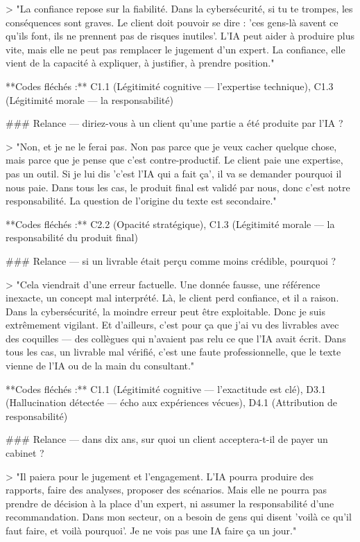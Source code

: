 > "La confiance repose sur la fiabilité. Dans la cybersécurité, si tu te trompes, les conséquences sont graves. Le client doit pouvoir se dire : 'ces gens-là savent ce qu'ils font, ils ne prennent pas de risques inutiles'. L'IA peut aider à produire plus vite, mais elle ne peut pas remplacer le jugement d'un expert. La confiance, elle vient de la capacité à expliquer, à justifier, à prendre position."

**Codes fléchés :** C1.1 (Légitimité cognitive — l'expertise technique), C1.3 (Légitimité morale — la responsabilité)

### Relance — diriez-vous à un client qu'une partie a été produite par l'IA ?

> "Non, et je ne le ferai pas. Non pas parce que je veux cacher quelque chose, mais parce que je pense que c'est contre-productif. Le client paie une expertise, pas un outil. Si je lui dis 'c'est l'IA qui a fait ça', il va se demander pourquoi il nous paie. Dans tous les cas, le produit final est validé par nous, donc c'est notre responsabilité. La question de l'origine du texte est secondaire."

**Codes fléchés :** C2.2 (Opacité stratégique), C1.3 (Légitimité morale — la responsabilité du produit final)

### Relance — si un livrable était perçu comme moins crédible, pourquoi ?

> "Cela viendrait d'une erreur factuelle. Une donnée fausse, une référence inexacte, un concept mal interprété. Là, le client perd confiance, et il a raison. Dans la cybersécurité, la moindre erreur peut être exploitable. Donc je suis extrêmement vigilant. Et d'ailleurs, c'est pour ça que j'ai vu des livrables avec des coquilles — des collègues qui n'avaient pas relu ce que l'IA avait écrit. Dans tous les cas, un livrable mal vérifié, c'est une faute professionnelle, que le texte vienne de l'IA ou de la main du consultant."

**Codes fléchés :** C1.1 (Légitimité cognitive — l'exactitude est clé), D3.1 (Hallucination détectée — écho aux expériences vécues), D4.1 (Attribution de responsabilité)

### Relance — dans dix ans, sur quoi un client acceptera-t-il de payer un cabinet ?

> "Il paiera pour le jugement et l'engagement. L'IA pourra produire des rapports, faire des analyses, proposer des scénarios. Mais elle ne pourra pas prendre de décision à la place d'un expert, ni assumer la responsabilité d'une recommandation. Dans mon secteur, on a besoin de gens qui disent 'voilà ce qu'il faut faire, et voilà pourquoi'. Je ne vois pas une IA faire ça un jour."

